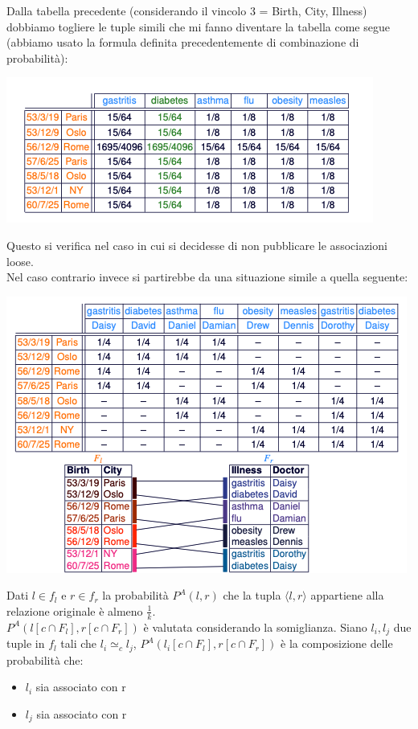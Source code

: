 Dalla tabella precedente (considerando il vincolo 3 = {Birth, City, Illness}) dobbiamo togliere le tuple simili che mi fanno diventare la tabella come segue (abbiamo usato la formula definita precedentemente di combinazione di probabilità): 
\begin{center}
    \includegraphics[scale=0.5]{img/exposure1.png}
\end{center}
Questo si verifica nel caso in cui si decidesse di non pubblicare le associazioni loose.\\
Nel caso contrario invece si partirebbe da una situazione simile a quella seguente:
\begin{center}
    \includegraphics[scale=0.5]{img/exposure2.png}
\end{center}
Dati \(l \in f_l\) e \(r \in f_r\) la probabilità \(P^A(l,r)\) che la tupla \(\langle l,r \rangle\) appartiene alla relazione originale è almeno \(\frac{1}{k}\).\\
\(P^A(l[c \cap F_l],r[c \cap F_r])\) è valutata considerando la somiglianza. Siano \(l_i,l_j\) due tuple in \(f_l\) tali che \(l_i \simeq_c l_j\), \(P^A(l_i[c \cap F_l],r[c \cap F_r])\) è la composizione delle probabilità che:
\begin{itemize}
    \item \(l_i\) sia associato con r
    \item \(l_j\) sia associato con r
\end{itemize}
